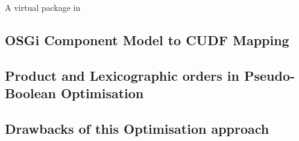 A virtual package in



\subsection{OSGi Component Model to CUDF Mapping}




\subsection{Product and Lexicographic orders in Pseudo-Boolean Optimisation}

\subsection{Drawbacks of this Optimisation approach}








